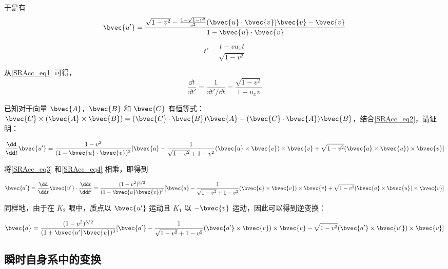 于是有
\begin{equation}\label{SRAcc_eq2}
\bvec{u'}=\frac{\sqrt{1-v^2}-\frac{1-\sqrt{1-v^2}}{v^2}(\bvec{u}\cdot\bvec{v})\bvec{v}-\bvec{v}}{1-\bvec{u}\cdot\bvec{v}}
\end{equation}

\begin{equation}\label{SRAcc_eq1}
t'=\frac{t-vu_xt}{\sqrt{1-v^2}}
\end{equation}

从\autoref{SRAcc_eq1} 可得，
\begin{equation}\label{SRAcc_eq3}
\frac{\dd t}{\dd t'}=\frac{1}{\dd t'/\dd t}=\frac{\sqrt{1-v^2}}{1-u_xv}
\end{equation}

\begin{exercise}{}

已知对于向量 $\bvec{A}$，$\bvec{B}$ 和 $\bvec{C}$ 有恒等式：$\bvec{C}\times(\bvec{A}\times\bvec{B})=(\bvec{C}\cdot\bvec{B})\bvec{A}-(\bvec{C}\cdot\bvec{A})\bvec{B}$，结合\autoref{SRAcc_eq2}，请证明：

\begin{equation}\label{SRAcc_eq4}
\frac{\dd}{\dd t}\bvec{u'}=\frac{1-v^2}{(1-\bvec{u}\cdot\bvec{v})^2}[\bvec{a}-\frac{1}{\sqrt{1-v^2}+1-v^2}(\bvec{a}\times\bvec{v})\times\bvec{v}+\sqrt{1-v^2}(\bvec{a}\times\bvec{u})\times\bvec{v}]
\end{equation}

\end{exercise}

将\autoref{SRAcc_eq3} 和\autoref{SRAcc_eq4} 相乘，即得到

\begin{equation}
\bvec{a'}=\frac{\dd}{\dd t}\bvec{u'}\cdot\frac{\dd t}{\dd t'}=\frac{(1-v^2)^{3/2}}{(1-\bvec{u}\bvec{v})^3}[\bvec{a}-\frac{1}{\sqrt{1-v^2}+1-v^2}(\bvec{a}\times\bvec{v})\times\bvec{v}+\sqrt{1-v^2}(\bvec{a}\times\bvec{u})\times\bvec{v}]
\end{equation}

同样地，由于在 $K_2$ 眼中，质点以 $\bvec{u'}$ 运动且 $K_1$ 以 $-\bvec{v}$ 运动，因此可以得到逆变换：

\begin{equation}\label{SRAcc_eq5}
\bvec{a}=\frac{(1-v^2)^{3/2}}{(1+\bvec{u'}\bvec{v})^3}[\bvec{a'}-\frac{1}{\sqrt{1-v^2}+1-v^2}(\bvec{a'}\times\bvec{v})\times\bvec{v}-\sqrt{1-v^2}(\bvec{a'}\times\bvec{u'})\times\bvec{v}]
\end{equation}


\subsection{瞬时自身系中的变换}

